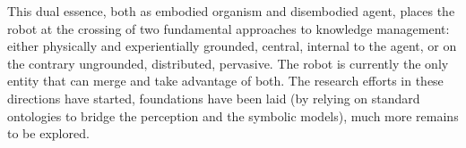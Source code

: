 This dual essence, both as embodied organism and disembodied agent, places the
robot at the crossing of two fundamental approaches to knowledge management:
either physically and experientially grounded, central, internal to the agent,
or on the contrary ungrounded, distributed, pervasive. The robot is currently
the only entity that can merge and take advantage of both. The research efforts
in these directions have started, foundations have been laid (by relying on
standard ontologies to bridge the perception and the symbolic models), much
more remains to be explored.




